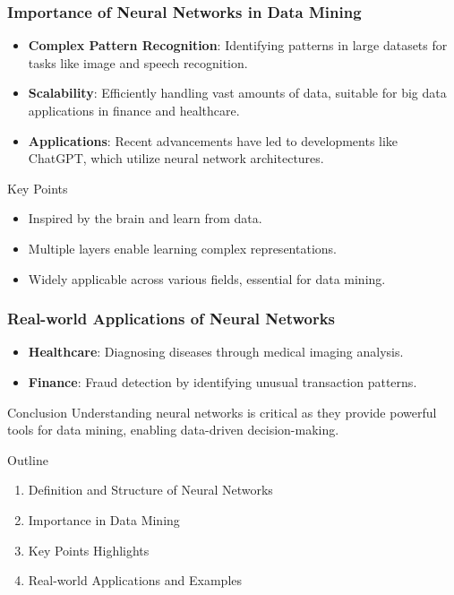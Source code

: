 \documentclass[aspectratio=169]{beamer}
\begin{document}
\begin{frame}[fragile]
    \frametitle{Importance of Neural Networks in Data Mining}
    \begin{itemize}
        \item \textbf{Complex Pattern Recognition}: Identifying patterns in large datasets for tasks like image and speech recognition.
        \item \textbf{Scalability}: Efficiently handling vast amounts of data, suitable for big data applications in finance and healthcare.
        \item \textbf{Applications}: Recent advancements have led to developments like ChatGPT, which utilize neural network architectures.
    \end{itemize}
    
    \begin{block}{Key Points}
        \begin{itemize}
            \item Inspired by the brain and learn from data.
            \item Multiple layers enable learning complex representations.
            \item Widely applicable across various fields, essential for data mining.
        \end{itemize}
    \end{block}
\end{frame}

\begin{frame}[fragile]
    \frametitle{Real-world Applications of Neural Networks}
    \begin{itemize}
        \item \textbf{Healthcare}: Diagnosing diseases through medical imaging analysis.
        \item \textbf{Finance}: Fraud detection by identifying unusual transaction patterns.
    \end{itemize}
    
    \begin{block}{Conclusion}
        Understanding neural networks is critical as they provide powerful tools for data mining, enabling data-driven decision-making.
    \end{block}
    
    \begin{block}{Outline}
        \begin{enumerate}
            \item Definition and Structure of Neural Networks
            \item Importance in Data Mining
            \item Key Points Highlights
            \item Real-world Applications and Examples
        \end{enumerate}
    \end{block}
\end{frame}
\end{document}
